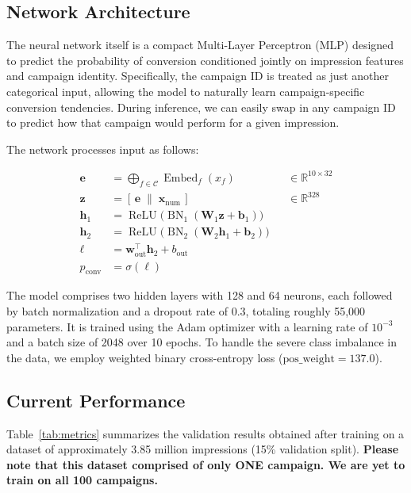 \documentclass[11pt]{article}
\begin{document}
\subsection{Network Architecture}

The neural network itself is a compact Multi-Layer Perceptron (MLP) designed to predict the probability of conversion conditioned jointly on impression features and campaign identity. Specifically, the campaign ID is treated as just another categorical input, allowing the model to naturally learn campaign-specific conversion tendencies. During inference, we can easily swap in any campaign ID to predict how that campaign would perform for a given impression.

The network processes input as follows:

\[
\begin{aligned}
\mathbf{e} &= \bigoplus_{f\in\mathcal{C}} \operatorname{Embed}_{f}(x_{f}) &&\in\mathbb{R}^{10\times32}\\
\mathbf{z} &= [\,\mathbf{e}\;\|\;\mathbf{x}_{\text{num}}\,] &&\in\mathbb{R}^{328}\\
\mathbf{h}_1 &= \operatorname{ReLU}\bigl(\operatorname{BN}_{1}(\mathbf{W}_1\mathbf{z} + \mathbf{b}_1)\bigr)\\
\mathbf{h}_2 &= \operatorname{ReLU}\bigl(\operatorname{BN}_{2}(\mathbf{W}_2\mathbf{h}_1 + \mathbf{b}_2)\bigr)\\
\ell &= \mathbf{w}_{\text{out}}^{\top}\mathbf{h}_2 + b_{\text{out}}\\[2pt]
p_{\text{conv}} &= \sigma(\ell)
\end{aligned}
\]

The model comprises two hidden layers with 128 and 64 neurons, each followed by batch normalization and a dropout rate of 0.3, totaling roughly 55,000 parameters. It is trained using the Adam optimizer with a learning rate of \(10^{-3}\) and a batch size of 2048 over 10 epochs. To handle the severe class imbalance in the data, we employ weighted binary cross-entropy loss (\(\text{pos\_weight} = 137.0\)).

\subsection{Current Performance}

Table~\ref{tab:metrics} summarizes the validation results obtained after training on a dataset of approximately 3.85 million impressions (15\% validation split). \textbf{Please note that this dataset comprised of only ONE campaign. We are yet to train on all 100 campaigns.}
\end{document}
